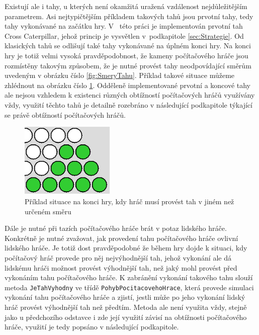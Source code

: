 Existují ale i tahy, u kterých není okamžitá uražená vzdálenost nejdůležitějším parametrem. Asi nejtypičtějším příkladem takových tahů jsou prvotní tahy, tedy tahy vykonávané na začátku hry. V~ této práci je implementován prvotní tah Cross Caterpillar, jehož princip je vysvětlen v~podkapitole \ref{sec:Strategie}. Od klasických tahů se odlišují také tahy vykonávané na úplném konci hry. Na konci hry je totiž velmi vysoká pravděpodobnost, že kameny počítačového hráče jsou rozmístěny takovým způsobem, že je nutné provést tahy neodpovídající směrům uvedeným v obrázku číslo \ref{fig:SmeryTahu}. Příklad takové situace můžeme zhlédnout na obrázku číslo \ref{fig:SituaceNaKonciHry}. Odděleně implementované prvotní a koncové tahy ale nejsou vzhledem k existenci různých obtížností počítačových hráčů využívány vždy, využití těchto tahů je detailně rozebráno v následující podkapitole týkající se právě obtížností počítačových hráčů.

\begin{figure}
	\centering
	\includegraphics[width=0.4\textwidth]{Figures/SituaceNaKonciHry.png}
	\caption{Příklad situace na konci hry, kdy hráč musí provést tah v jiném než určeném směru}
    \label{fig:SituaceNaKonciHry}
\end{figure}

Dále je nutné při tazích počítačového hráče brát v potaz lidského hráče. Konkrétně je nutné zvažovat, jak provedení tahu počítačového hráče ovlivní lidského hráče. Je totiž dost pravděpodobné že během hry dojde k situaci, kdy počítačový hráč provede pro něj nejvýhodnější tah, jehož vykonání ale dá lidskému hráči možnost provést výhodnější tah, než jaký mohl provést před vykonáním tahu počítačového hráče. K zabránění vykonání takového tahu slouží metoda \lstinline$JeTahVyhodny$ ve třídě \lstinline$PohybPocitacovehoHrace$, která provede simulaci vykonání tahu počítačového hráče a zjistí, jestli může po jeho vykonání lidský hráč provést výhodnější tah než předtím. Metoda ale není využita vždy, stejně jako u předchozího odstavce i zde její využití závisí na obtížnosti počítačového hráče, využití je tedy popsáno v následující podkapitole.

